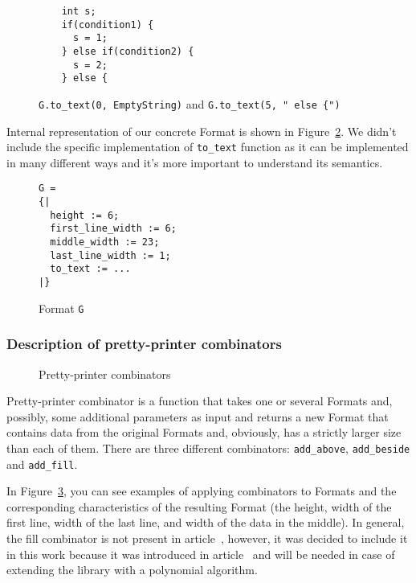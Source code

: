 \documentclass[14pt]{constructor-diploma}
\begin{document}
\begin{enumerate}
\begin{figure}[H]
\begin{minipage}{0.5\textwidth}
\begin{mdframed}[backgroundcolor=bg]
\begin{verbatim}
    int s;
    if(condition1) { 
      s = 1; 
    } else if(condition2) { 
      s = 2; 
    } else {
\end{verbatim}
\end{mdframed}
\end{minipage}
\caption{\texttt{G.to\_text(0, EmptyString)} and \texttt{G.to\_text(5, " else \{")}}
\label{fig:to_text_example}
\end{figure}
\end{enumerate}

Internal representation of our concrete Format is shown in Figure~\ref{fig:format_example}.
We didn't include the specific implementation of \texttt{to\_text} function as it can be implemented 
in many different ways and it's more important to understand its semantics.
\begin{figure}[H]
\begin{mdframed}[backgroundcolor=bg]
\begin{verbatim}
G = 
{|
  height := 6;
  first_line_width := 6;
  middle_width := 23;
  last_line_width := 1;
  to_text := ...
|}
\end{verbatim}
\end{mdframed}
\caption{Format \texttt{G}}
\label{fig:format_example}
\end{figure}


\label{section_combinators}
\subsubsection{Description of pretty-printer combinators}
\begin{figure}[H]
\begin{center}

\caption{Pretty-printer combinators}
\label{fig:combinators}
\end{center}
\end{figure}
Pretty-printer combinator is a function that takes one or several Formats and, possibly, some additional parameters as input and returns a new Format that contains data from the original Formats and, 
obviously, has a strictly larger size than each of them. 
There are three different combinators: \texttt{add\_above}, \texttt{add\_beside} and 
\texttt{add\_fill}.

In Figure~\ref{fig:combinators}, you can see examples of applying combinators to Formats 
and the corresponding characteristics of the resulting Format 
(the height, width of the first line, width of the last line, and width of the data in the middle). 
In general, the fill combinator is not present in article~\cite{swierstra},
however, it was decided to include it in this work because it was introduced 
in article~\cites{podkopaev} and will be needed in case of extending the library 
with a polynomial algorithm.
\end{document}
